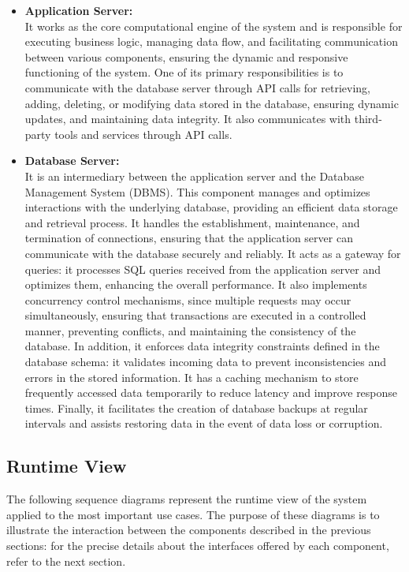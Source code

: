\begin{itemize}
    \item \textbf{Application Server:} \\
    It works as the core computational engine of the system and is responsible for executing business logic, managing data flow, and facilitating communication between various components, ensuring the dynamic and responsive functioning of the system. One of its primary responsibilities is to communicate with the database server through API calls for retrieving, adding, deleting, or modifying data stored in the database, ensuring dynamic updates, and maintaining data integrity. It also communicates with third-party tools and services through API calls. 
    
    \item \textbf{Database Server:} \\
    It is an intermediary between the application server and the Database Management System (DBMS). This component manages and optimizes interactions with the underlying database, providing an efficient data storage and retrieval process. It handles the establishment, maintenance, and termination of connections, ensuring that the application server can communicate with the database securely and reliably. It acts as a gateway for queries: it processes SQL queries received from the application server and optimizes them, enhancing the overall performance. It also implements concurrency control mechanisms, since multiple requests may occur simultaneously, ensuring that transactions are executed in a controlled manner, preventing conflicts, and maintaining the consistency of the database. In addition, it enforces data integrity constraints defined in the database schema: it validates incoming data to prevent inconsistencies and errors in the stored information. It has a caching mechanism to store frequently accessed data temporarily to reduce latency and improve response times. Finally, it facilitates the creation of database backups at regular intervals and assists restoring data in the event of data loss or corruption.
\end{itemize}

\subsection{Runtime View}
 The following sequence diagrams represent the runtime view of the system applied to the most important use cases. The purpose of these diagrams is to illustrate the interaction between the components described in the previous sections: for the precise details about the interfaces offered by each component, refer to the next section.

